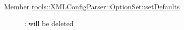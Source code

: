 \label{deprecated__deprecated000001}
\hypertarget{deprecated__deprecated000001}{}
 \begin{description}
\item[Member \hyperlink{classtools_1_1XMLConfigParser_1_1OptionSet_6c3e2b6ef7030f2f9525bb52de68531d}{tools::XMLConfigParser::OptionSet::setDefaults} ]: will be deleted \end{description}
